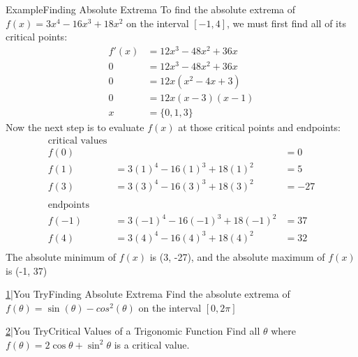 \documentclass{MathNotes}
\newenvironment{example}[1]{\begin{BlueBox}{Example}{#1}}{\end{BlueBox}}
\newenvironment{practice}[2]{\begin{PurpleBox}{\texorpdfstring{#1}\Big|You Try}{#2}}{\end{PurpleBox}}
\begin{document}
\begin{example}{Finding Absolute Extrema}\label{ex:find-abs-extrema}
	To find the absolute extrema of $f(x)=3x^4-16x^3+18x^2$ on the interval
	$[-1, 4]$, we must first find all of its critical points:
	\begin{align*}
		f'(x) & =12x^3-48x^2+36x \\
		0     & =12x^3-48x^2+36x \\
		0     & =12x(x^2-4x+3)   \\
		0     & =12x(x-3)(x-1)   \\
		x     & =\{0, 1, 3\}
	\end{align*}
	Now the next step is to evaluate $f(x)$ at those critical points and
	endpoints:
	\begin{align*}
		\text{critical values}                    \\
		f(0)  &                            & =0   \\
		f(1)  & =3(1)^4-16(1)^3+18(1)^2    & =5   \\
		f(3)  & =3(3)^4-16(3)^3+18(3)^2    & =-27 \\
		\\
		\text{endpoints}                          \\
		f(-1) & =3(-1)^4-16(-1)^3+18(-1)^2 & =37  \\
		f(4)  & =3(4)^4-16(4)^3+18(4)^2    & =32  \\
	\end{align*}
	The absolute minimum of $f(x)$ is (3, -27), and the absolute maximum of
	$f(x)$ is (-1, 37)
\end{example}

\begin{multicols}{2}
	\begin{practice}{\hyperref[ans:find-abs-extrema]{1}}{Finding Absolute Extrema}\label{prac:find-abs-extrema}
		Find the absolute extrema of $f(\theta)=\sin(\theta)-cos^2(\theta)$ on
		the interval $[0, 2\pi]$
	\end{practice}

	\begin{practice}{\hyperref[ans:critical-values]{2}}{Critical Values of a Trigonomic Function}\label{prac:critical-values}
		Find all $\theta$ where $\displaystyle f(\theta)=2\cos\theta+\sin^2\theta$
		is a critical value.
	\end{practice}
\end{multicols}
\end{document}
